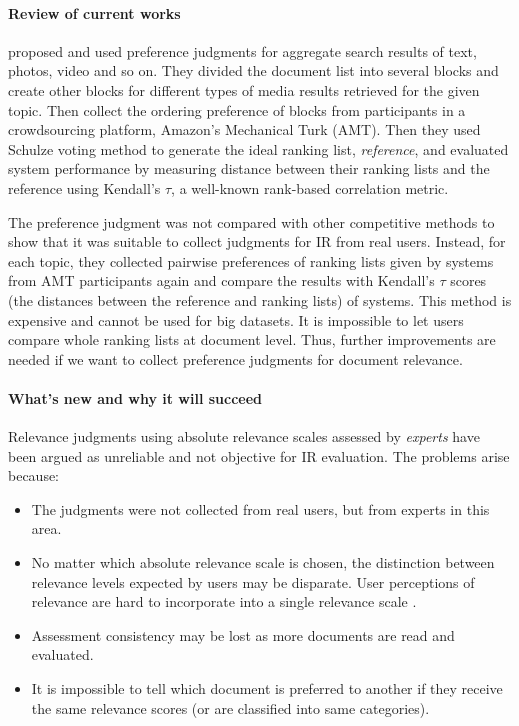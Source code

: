 \documentclass{article}
\begin{document}
\paragraph{Review of current works} \citet{eval.aggregated.search} proposed and used preference judgments for aggregate search results of text, photos, video and so on. They divided the document list into several blocks and create other blocks for different types of media results retrieved for the given topic. Then collect the ordering preference of blocks from participants in a crowdsourcing platform, Amazon’s Mechanical Turk (AMT). Then they used Schulze voting method \cite{schulze} to generate the ideal ranking list, \textit{reference}, and evaluated system performance by measuring distance between their ranking lists and the reference using Kendall's $\tau$, a well-known rank-based correlation metric.

The preference judgment was not compared with other competitive methods to show that it was suitable to collect judgments for IR from real users. Instead, for each topic, they collected pairwise preferences of ranking lists given by systems from AMT participants again and compare the results with Kendall's $\tau$ scores (the distances between the reference and ranking lists) of systems. This method is expensive and cannot be used for big datasets. It is impossible to let users compare whole ranking lists at document level. Thus, further improvements are needed if we want to collect preference judgments for document relevance.

\paragraph{What's new and why it will succeed} Relevance judgments using absolute relevance scales assessed by \textit{experts} have been argued as unreliable and not objective \cite{influence.scale.form.rel.judge, judges.exchangeable.matter,variation.rel.judge.measure,disagree.btw.judges} for IR evaluation. The problems arise because:
\begin{itemize}
\item The judgments were not collected from real users, but from experts in this area.
\item No matter which absolute relevance scale is chosen, the distinction between relevance levels expected by users may be disparate. User perceptions of relevance are hard to incorporate into a single relevance scale \cite{benefits.ME}.
\item Assessment consistency may be lost as more documents are read and evaluated.
\item It is impossible to tell which document is preferred to another if they receive the same relevance scores (or are classified into same categories).
\end{itemize}
\end{document}
